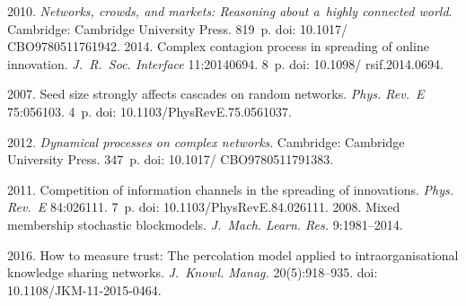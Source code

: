 



\vspace*{6pt}

  \begin{multicols}{2}

\renewcommand{\bibname}{\protect\rmfamily References}

{\small\frenchspacing
 {%
 \begin{thebibliography}{99}


 2010. \textit{Networks, crowds, and markets: Reasoning about 
a~highly connected  world}. Cambridge: Cambridge University Press. 819~p. 
doi:  10.1017/ CBO9780511761942.
 2014. Complex contagion process in spreading of online 
innovation. \textit{J.~R.~Soc. Interface} 11:20140694. 8~p. 
doi: 10.1098/ rsif.2014.0694.

 2007. Seed size strongly affects cascades on random networks. 
\textit{Phys. Rev.~E} 75:056103. 4~p.  doi: 10.1103/PhysRevE.75.0561037.

 2012. \textit{Dynamical processes on complex networks}. 
Cambridge: Cambridge University Press. 347~p. doi: 10.1017/ CBO9780511791383.

 2011. Competition of information channels in the spreading of innovations. 
\textit{Phys. Rev.~E} 84:026111. 7~p. doi: 10.1103/PhysRevE.84.026111.
 2008. Mixed membership stochastic 
blockmodels. \textit{J.~Mach. Learn. Res.} 9:1981--2014.

 2016. How to measure trust: The percolation model 
applied to intraorganisational knowledge sharing networks. \textit{J.~Knowl. Manag.} 20(5):918--935.
doi: 10.1108/JKM-11-2015-0464.


\end{thebibliography}}}
\end{multicols}
